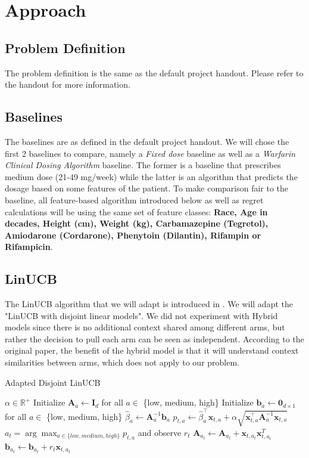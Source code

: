 \documentclass{article}
\begin{document}
\section{Approach}
\subsection{Problem Definition}
The problem definition is the same as the default project handout. Please refer to the handout for more information.

\subsection{Baselines}
\label{baseline}
The baselines are as defined in the default project handout. We will chose the first 2 baselines to compare, namely a \textit{Fixed dose} baseline as well as a \textit{Warfarin Clinical Dosing Algorithm} baseline. The former is a baseline that prescribes medium dose (21-49 mg/week) while the latter is an algorithm that predicts the dosage based on some features of the patient. To make comparison fair to the baseline, all feature-based algorithm introduced below as well as regret calculations will be using the same set of feature classes: \textbf{Race, Age in decades, Height (cm), Weight (kg), Carbamazepine (Tegretol), Amiodarone (Cordarone), Phenytoin (Dilantin), Rifampin or Rifampicin}.

\subsection{LinUCB}
The LinUCB algorithm that we will adapt is introduced in \citet{li2010contextual}. We will adapt the "LinUCB with disjoint linear models". We did not experiment with Hybrid models since there is no additional context shared among different arms, but rather the decision to pull each arm can be seen as independent. According to the original paper, the benefit of the hybrid model is that it will understand context similarities between arms, which does not apply to our problem.
\begin{algorithm}[tbh]
	\caption{Adapted Disjoint LinUCB}
	\label{alg:linucb}
	\begin{algorithmic}
		 $\alpha\in\mathbb{R}^+$
		\STATE Initialize $\mathbf{A}_a\leftarrow\mathbf{I}_d$ for all $a\in$ \{low, medium, high\}
		\STATE Initialize $\mathbf{b}_a\leftarrow\mathbf{0}_{d\times 1}$ for all $a\in$ \{low, medium, high\}
		\STATE $\hat{\beta}_a \leftarrow \mathbf{A}_a^{-1}\mathbf{b}_a$
		\STATE $p_{t, a}\leftarrow \hat{\beta}_a^\top \mathbf{x}_{t, a} + \alpha\sqrt{\mathbf{x}_{t, a}^\top\mathbf{A}_a^{-1}\mathbf{x}_{t, a}}$
		\ENDFOR
		\STATE $a_t = \arg\max_{a\in\{low, medium, high\}} p_{t, a}$ and observe $r_t$
		\STATE $\mathbf{A}_{a_t}\leftarrow \mathbf{A}_{a_t} + \mathbf{x}_{t, a_t}\mathbf{x}_{t, a_t}^T$
		\STATE $\mathbf{b}_{a_t}\leftarrow \mathbf{b}_{a_t} + r_t \mathbf{x}_{t, a_t}$
		\ENDFOR
	\end{algorithmic}
\end{algorithm}
\end{document}
